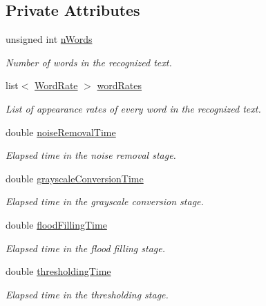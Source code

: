 \subsection*{Private Attributes}
\begin{CompactItemize}
\item 
unsigned int \hyperlink{class_statistics_cef381529a0baef3870133f42b6aa8dd}{nWords}
\begin{CompactList}\small\item\em Number of words in the recognized text. \item\end{CompactList}\item 
list$<$ \hyperlink{struct_word_rate}{WordRate} $>$ \hyperlink{class_statistics_f656c644cb43977450422c215b2130c6}{wordRates}
\begin{CompactList}\small\item\em List of appearance rates of every word in the recognized text. \item\end{CompactList}\item 
double \hyperlink{class_statistics_4a194feb4de2fc619d311b2adb2a7e74}{noiseRemovalTime}
\begin{CompactList}\small\item\em Elapsed time in the noise removal stage. \item\end{CompactList}\item 
double \hyperlink{class_statistics_fc22ca2705714cfc44c45c772475c1cb}{grayscaleConversionTime}
\begin{CompactList}\small\item\em Elapsed time in the grayscale conversion stage. \item\end{CompactList}\item 
double \hyperlink{class_statistics_6c2cd48482d1de181cb2dd32b3315449}{floodFillingTime}
\begin{CompactList}\small\item\em Elapsed time in the flood filling stage. \item\end{CompactList}\item 
double \hyperlink{class_statistics_e2c88c8b599b217ad3f316cca7a15a23}{thresholdingTime}
\begin{CompactList}\small\item\em Elapsed time in the thresholding stage. \item\end{CompactList}\item 

\end{CompactItemize}
